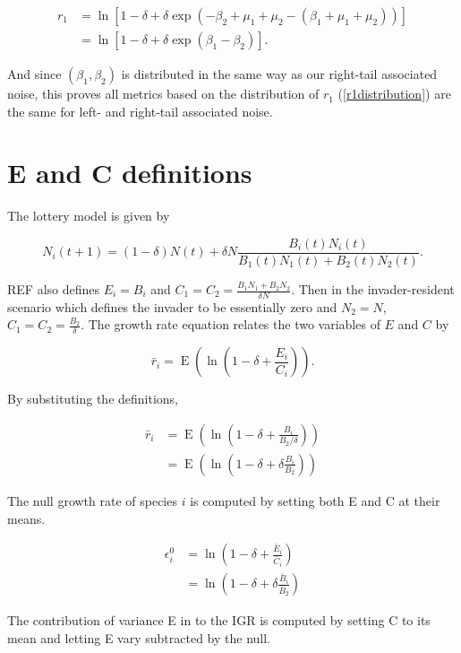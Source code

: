 \documentclass[letterpaper,11pt]{article}
\DeclareMathOperator{\EX}{E}%
\begin{document}
\begin{align}
r_1 &= \ln[1-\delta+\delta \exp(-\beta_2+\mu_1+\mu_2-(\beta_1+\mu_1+\mu_2))]\\
&= \ln[1-\delta+\delta \exp(\beta_1-\beta_2)].
\end{align}

\noindent And since $(\beta_1, \beta_2)$ is distributed in the same way as our right-tail associated noise, this proves all metrics based on the distribution of $r_1$ (\ref{r1distribution}) are the same for left- and right-tail associated noise.

\section{E and C definitions}

The lottery model is given by

\begin{equation}
N_i(t+1)=(1-\delta)N(t)+\delta N \frac{B_i(t)N_i(t)}{B_1(t)N_1(t)+B_2(t)N_2(t)}.  
\end{equation}

REF also defines $E_i = B_i$ and $C_1=C_2=\frac{B_1 N_1 + B_2 N_2}{\delta N}$. Then in the invader-resident scenario which defines the invader to be essentially zero and $N_2 = N$, $C_1 = C_2 = \frac{B_2}{\delta}$. The growth rate equation relates the two variables of $E$ and $C$ by

\begin{equation}
\bar r_i=\EX(\ln(1-\delta + \frac{E_i}{C_i})).\label{rbarEC}
\end{equation}

\noindent By substituting the definitions,

\begin{align}
\bar r_i &=\EX(\ln(1-\delta + \frac{B_i}{B_2/ \delta})) \\
&= \EX(\ln(1-\delta +\delta \frac{B_i}{B_2})) 
\end{align}

The null growth rate of species $i$ is computed by setting both E and C at their means. 

\begin{align}
\epsilon_i^0 &=\ln(1-\delta + \frac{\bar E_i}{\bar C_i}) \\
&=\ln(1-\delta + \delta \frac{\bar B_i}{\bar B_2}) 
\end{align}

The contribution of variance E in to the IGR is computed by setting C to its mean and letting E vary subtracted by the null. 
\end{document}
